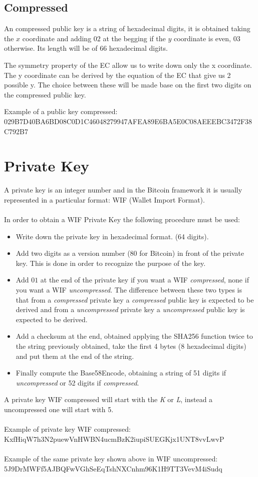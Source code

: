 \subsection{Compressed}
An compressed public key is a string of hexadecimal digits, it is obtained taking the $x$ coordinate and adding $02$ at the begging if the $y$ coordinate is even, $03$ otherwise. Its length will be of $66$ hexadecimal digits.

\begin{remark}
	The symmetry property of the EC allow us to write down only the x coordinate. The y coordinate can be derived by the equation of the EC that give us 2 possible y. The choice between these will be made base on the first two digits on the compressed public key.
\end{remark}
Example of a public key compressed:\\
029B7D40BA6BD08C0D1C46048279947AFEA89E6BA5E0C08AEEEBC3472F38C792B7


\section{Private Key}
A private key is an integer number and in the Bitcoin framework it is usually represented in a particular format: WIF (Wallet Import Format). 
\\ \\
In order to obtain a WIF Private Key the following procedure must be used:
\begin{itemize}
	\item Write down the private key in hexadecimal format. (64 digits).
	\item Add two digits as a version number ($80$ for Bitcoin) in front of the private key. This is done in order to recognize the purpose of the key.
	\item Add $01$ at the end of the private key if you want a WIF \textit{compressed}, none if you want a WIF \textit{uncompressed}. The difference between these two types is that from a \textit{compressed} private key a \textit{compressed} public key is expected to be derived and from a \textit{uncompressed} private key a \textit{uncompressed} public key is expected to be derived.
	\item Add a checksum at the end, obtained applying the SHA256 function twice to the string previously obtained, take the first 4 bytes (8 hexadecimal digits) and put them at the end of the string.
	\item Finally compute the Base58Encode, obtaining a string of 51 digits if \textit{uncompressed} or 52 digits if \textit{compressed}.
\end{itemize}
A private key WIF compressed will start with the \textit{K} or \textit{L}, instead a uncompressed one will start with 5.
\\ \\
Example of private key WIF compressed: \\ KxfHiqW7h3N2puewVnHWBN4ucmBzK2iupiSUEGKjx1UNT8vvLwvP
\\ \\
Example of the same private key shown above in WIF uncompressed: \\ 5J9DrMWFf5AJBQFwVGhSeEqTshNXCnhm96K1H9TT3VevM4iSudq

